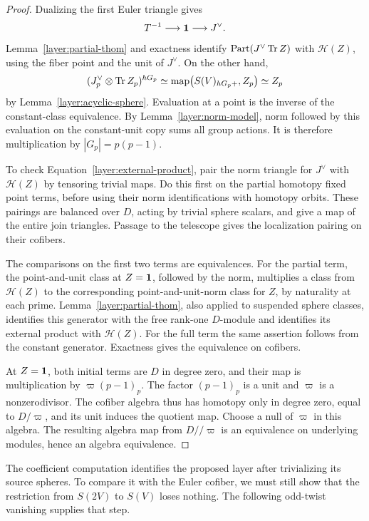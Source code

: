 \begin{proof}
Dualizing the first Euler triangle gives
\[
 T^{-1}\longrightarrow\mathbf 1\longrightarrow J^\vee.
\]
Lemma~\ref{layer:partial-thom} and exactness identify
$\operatorname{Part}(J^\vee\operatorname{Tr} Z)$ with $\mathcal H(Z)$, using the
fiber point and the unit of $J^\vee$. On the other hand,
\[
 (J_p^\vee\otimes\operatorname{Tr} Z_p)^{hG_p}
 \simeq\operatorname{map}\bigl(S(V)_{hG_p+},Z_p\bigr)
 \simeq Z_p
\]
by Lemma~\ref{layer:acyclic-sphere}. Evaluation at a point is the
inverse of the constant-class equivalence. By
Lemma~\ref{layer:norm-model}, norm followed by this evaluation on
the constant-unit copy sums all group actions. It is therefore
multiplication by $|G_p|=p(p-1)$.

To check Equation~\eqref{layer:external-product}, pair the norm
triangle for $J^\vee$ with $\mathcal H(Z)$ by tensoring trivial
maps. Do this first on the partial homotopy fixed point terms,
before using their norm identifications with homotopy orbits. These
pairings are balanced over $D$, acting by trivial sphere scalars,
and give a map of the entire join triangles. Passage to the
telescope gives the localization pairing on their cofibers.

The comparisons on the first two terms are equivalences. For the
partial term, the point-and-unit class at $Z=\mathbf 1$, followed by
the norm, multiplies a class from $\mathcal H(Z)$ to the
corresponding point-and-unit-norm class for $Z$, by naturality at
each prime. Lemma~\ref{layer:partial-thom}, also applied to
suspended sphere classes, identifies this generator with the free
rank-one $D$-module and identifies its external product with
$\mathcal H(Z)$. For the full term the same assertion follows from
the constant generator. Exactness gives the equivalence on
cofibers.

At $Z=\mathbf 1$, both initial terms are $D$ in degree zero, and their
map is multiplication by $\varpi(p-1)_p$. The factor $(p-1)_p$ is a
unit and $\varpi$ is a nonzerodivisor. The cofiber algebra thus has
homotopy only in degree zero, equal to $D/\varpi$, and its unit
induces the quotient map. Choose a null of $\varpi$ in this
algebra. The resulting algebra map from $D//\varpi$ is an
equivalence on underlying modules, hence an algebra equivalence.
\end{proof}

The coefficient computation identifies the proposed layer after
trivializing its source spheres. To compare it with the Euler
cofiber, we must still show that the restriction from $S(2V)$ to
$S(V)$ loses nothing. The following odd-twist vanishing supplies
that step.

